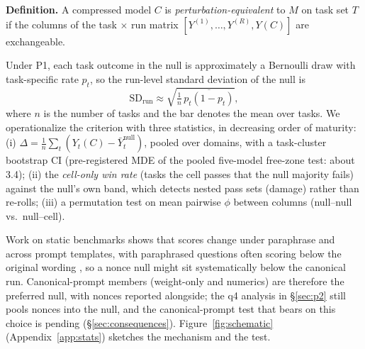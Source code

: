 \textbf{Definition.} A compressed model $C$ is \emph{perturbation-equivalent} to $M$ on task set $T$ if the columns of the task $\times$ run matrix $[Y^{(1)}, \ldots, Y^{(R)}, Y(C)]$ are exchangeable.

Under P1, each task outcome in the null is approximately a Bernoulli draw with task-specific rate $p_t$, so the run-level standard deviation of the null is
\begin{equation}
\mathrm{SD}_{\text{run}} \approx \sqrt{\tfrac{1}{n}\,\overline{p_t(1-p_t)}},
\end{equation}
where $n$ is the number of tasks and the bar denotes the mean over tasks. We operationalize the criterion with three statistics, in decreasing order of maturity: (i) $\Delta = \frac{1}{n}\sum_t (Y_t(C) - \bar{Y}_t^{\text{null}})$, pooled over domains, with a task-cluster bootstrap CI (pre-registered MDE of the pooled five-model free-zone test: about 3.4\pp{}); (ii) the \emph{cell-only win rate} (tasks the cell passes that the null majority fails) against the null's own band, which detects nested pass sets (damage) rather than re-rolls; (iii) a permutation test on mean pairwise $\phi$ between columns (null--null vs.\ null--cell). 

Work on static benchmarks shows that scores change under paraphrase and across prompt templates, with paraphrased questions often scoring below the original wording \citep{lunardi2025robustness,mizrahi2024multiprompt}, so a nonce null might sit systematically below the canonical run. Canonical-prompt members (weight-only and numerics) are therefore the preferred null, with nonces reported alongside; the q4 analysis in \S\ref{sec:p2} still pools nonces into the null, and the canonical-prompt test that bears on this choice is pending (\S\ref{sec:consequences}). Figure~\ref{fig:schematic} (Appendix~\ref{app:stats}) sketches the mechanism and the test.
